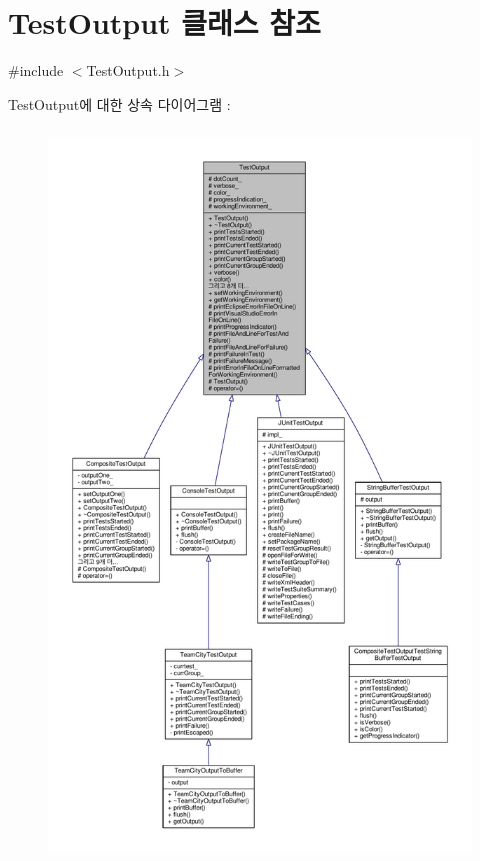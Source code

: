 \hypertarget{class_test_output}{}\section{Test\+Output 클래스 참조}
\label{class_test_output}


{\ttfamily \#include $<$Test\+Output.\+h$>$}



Test\+Output에 대한 상속 다이어그램 \+: 
\nopagebreak
\begin{figure}[H]
\begin{center}
\leavevmode
\includegraphics[height=550pt]{class_test_output__inherit__graph}
\end{center}
\end{figure}


